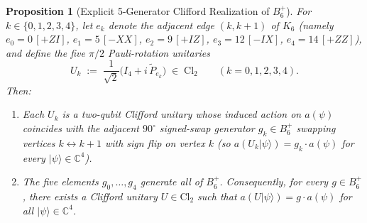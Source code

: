 \documentclass[11pt,a4paper]{article}
\theoremstyle{plain}
\newtheorem{proposition}[theorem]{Proposition}
\theoremstyle{definition}
\theoremstyle{remark}
\newcommand{\C}{\mathbb{C}}
\newcommand{\ket}[1]{\lvert #1 \rangle}
\newcommand{\Cl}{\mathrm{Cl}}
\newcommand{\Bplus}{B_6^+}
\begin{document}
\begin{proposition}[Explicit 5-Generator Clifford Realization of $\Bplus$]
\label{prop:clifford-lift}
For $k \in \{0,1,2,3,4\}$, let $e_k$ denote the adjacent edge $(k, k+1)$ of $K_6$ (namely $e_0 = 0\,[+ZI]$, $e_1 = 5\,[-XX]$, $e_2 = 9\,[+IZ]$, $e_3 = 12\,[-IX]$, $e_4 = 14\,[+ZZ]$), and define the five $\pi/2$ Pauli-rotation unitaries
\begin{equation}
  \label{eq:cliff-gens}
  U_k \;:=\; \frac{1}{\sqrt{2}}\bigl(I_4 + i\,\tilde{P}_{e_k}\bigr) \;\in\; \Cl_2 \qquad (k = 0,1,2,3,4).
\end{equation}
Then:
\begin{enumerate}[label=\textup{(\alph*)}, leftmargin=2em]
  \item Each $U_k$ is a two-qubit Clifford unitary whose induced action on $a(\psi)$ coincides with the adjacent $90^\circ$ signed-swap generator $g_k \in \Bplus$ swapping vertices $k \leftrightarrow k+1$ with sign flip on vertex $k$ (so $a(U_k\ket{\psi}) = g_k \cdot a(\psi)$ for every $\ket{\psi} \in \C^4$).
  \item The five elements $g_0, \dots, g_4$ generate all of $\Bplus$. Consequently, for every $g \in \Bplus$, there exists a Clifford unitary $U \in \Cl_2$ such that $a(U\ket{\psi}) = g \cdot a(\psi)$ for all $\ket{\psi} \in \C^4$.
\end{enumerate}
\end{proposition}
\end{document}
